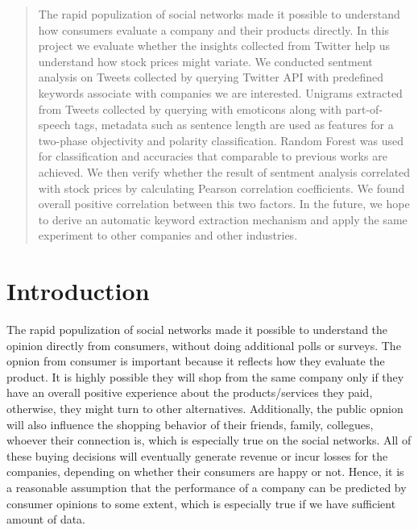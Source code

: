 \documentclass[12pt]{article}
\begin{document}
\maketitle



\begin{abstract}
The rapid populization of social networks made it possible to understand how consumers evaluate a company and their products directly. In this project we evaluate whether the insights collected from Twitter help us understand how stock prices might variate. We conducted sentment analysis on Tweets collected by querying Twitter API with predefined keywords associate with companies we are interested. Unigrams extracted from Tweets collected by querying with emoticons along with part-of-speech tags, metadata such as sentence length are used as features for a two-phase objectivity and polarity classification. Random Forest was used for classification and accuracies that comparable to previous works are achieved. We then verify whether the result of sentment analysis correlated with stock prices by calculating Pearson correlation coefficients. We found overall positive correlation between this two factors. In the future, we hope to derive an automatic keyword extraction mechanism and apply the same experiment to other companies and other industries.
\end{abstract}

\section{Introduction}
The rapid populization of social networks made it possible to understand the opinion directly from consumers, without doing additional polls or surveys. The opnion from consumer is important because it reflects how they evaluate the product. It is highly possible they will shop from the same company only if they have an overall positive experience about the products/services they paid, otherwise, they might turn to other alternatives. Additionally, the public opnion will also influence the shopping behavior of their friends, family, collegues, whoever their connection is, which is especially true on the social networks. All of these buying decisions will eventually generate revenue or incur losses for the companies, depending on whether their consumers are happy or not. Hence, it is a reasonable assumption that the performance of a company can be predicted by consumer opinions to some extent, which is especially true if we have sufficient amount of data. 
\end{document}
